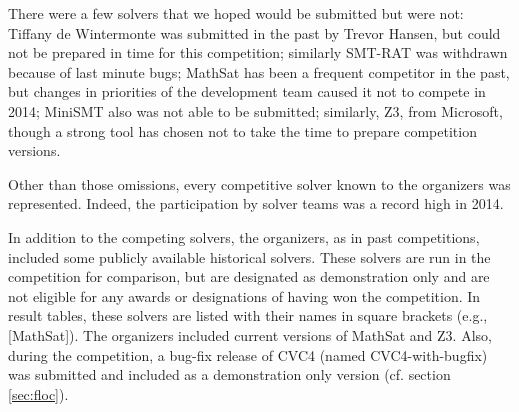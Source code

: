 \documentclass[twosize,11pt]{article}
\begin{document}
There were a few solvers that we hoped would be submitted but were not: Tiffany de Wintermonte was submitted in the past by Trevor Hansen, but could not be prepared in time for this competition; similarly SMT-RAT was withdrawn because of last minute bugs; MathSat has been a frequent competitor in the past, but changes in priorities of the development team caused it not to compete in 2014; MiniSMT also was not able to be submitted; similarly, Z3, from Microsoft, though a strong tool has chosen not to take the time to prepare competition versions.

Other than those omissions, every competitive solver known to the organizers was represented. Indeed, the participation by solver teams was a record high in 2014. 

In addition to the competing solvers, the organizers, as in past competitions, included some publicly available historical solvers. These solvers are run in the competition for comparison, but are designated as demonstration only and are not eligible for any awards or designations of having won the competition. In result tables, these solvers are listed with their names in square brackets (e.g., [MathSat]). The organizers included current versions of MathSat and Z3. Also, during the competition, a bug-fix release of CVC4 (named CVC4-with-bugfix) was submitted and included as a demonstration only version (cf. section \ref{sec:floc}).
\end{document}
